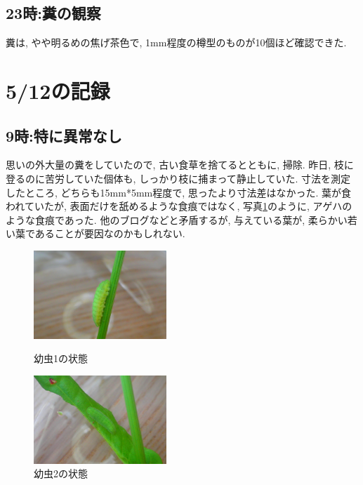 \documentclass{jsarticle}
\begin{document}
\subsection{23時:糞の観察}
糞は, やや明るめの焦げ茶色で, 1mm程度の樽型のものが10個ほど確認できた. 

\newpage
\section{5/12の記録}
\subsection{9時:特に異常なし}
思いの外大量の糞をしていたので, 古い食草を捨てるとともに, 掃除. 
昨日, 枝に登るのに苦労していた個体も, しっかり枝に捕まって静止していた. 
寸法を測定したところ, どちらも15mm*5mm程度で, 思ったより寸法差はなかった. 
葉が食われていたが, 表面だけを舐めるような食痕ではなく, 写真\ref{Larba-day2-2}のように, アゲハのような食痕であった. 
他のブログなどと矛盾するが, 与えている葉が, 柔らかい若い葉であることが要因なのかもしれない. 

\begin{figure}[htbp]
  \begin{minipage}{0.5\hsize}
    \begin{center}
      \includegraphics[width=5cm]{photo2/Larva1.JPG}
    \end{center}
    \caption{幼虫1の状態}
    \label{Larba-day2-1}
  \end{minipage}
  \begin{minipage}{0.5\hsize}
    \begin{center}
      \includegraphics[width=5cm]{photo2/Larva2.JPG}
    \end{center}
    \caption{幼虫2の状態}
    \label{Larba-day2-2}
  \end{minipage}
\end{figure}
\end{document}
